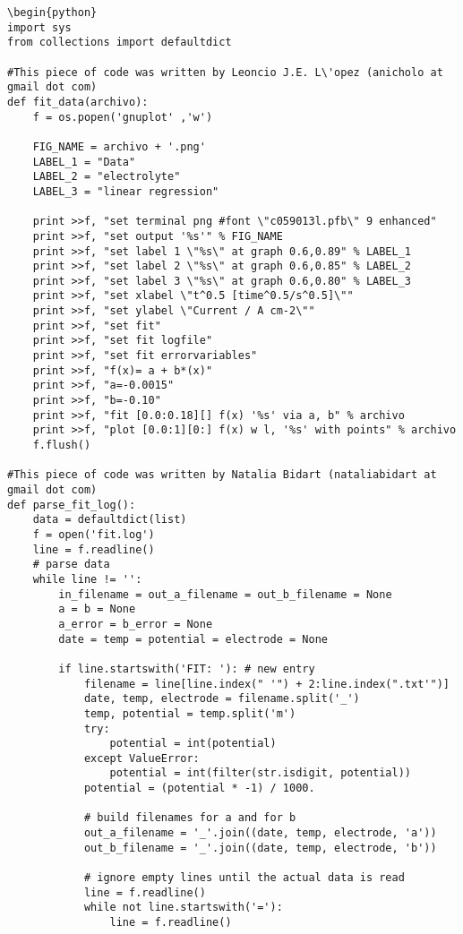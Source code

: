 \documentclass[a4paper]{article}
\begin{document}
\begin{verbatim}
\begin{python}
import sys
from collections import defaultdict

#This piece of code was written by Leoncio J.E. L\'opez (anicholo at gmail dot com) 
def fit_data(archivo):
    f = os.popen('gnuplot' ,'w')

    FIG_NAME = archivo + '.png'
    LABEL_1 = "Data"
    LABEL_2 = "electrolyte"
    LABEL_3 = "linear regression"

    print >>f, "set terminal png #font \"c059013l.pfb\" 9 enhanced"
    print >>f, "set output '%s'" % FIG_NAME
    print >>f, "set label 1 \"%s\" at graph 0.6,0.89" % LABEL_1
    print >>f, "set label 2 \"%s\" at graph 0.6,0.85" % LABEL_2
    print >>f, "set label 3 \"%s\" at graph 0.6,0.80" % LABEL_3
    print >>f, "set xlabel \"t^0.5 [time^0.5/s^0.5]\""
    print >>f, "set ylabel \"Current / A cm-2\""
    print >>f, "set fit"
    print >>f, "set fit logfile"
    print >>f, "set fit errorvariables"
    print >>f, "f(x)= a + b*(x)"
    print >>f, "a=-0.0015"
    print >>f, "b=-0.10"
    print >>f, "fit [0.0:0.18][] f(x) '%s' via a, b" % archivo
    print >>f, "plot [0.0:1][0:] f(x) w l, '%s' with points" % archivo
    f.flush()

#This piece of code was written by Natalia Bidart (nataliabidart at gmail dot com)
def parse_fit_log():
    data = defaultdict(list)
    f = open('fit.log')
    line = f.readline()
    # parse data
    while line != '':
        in_filename = out_a_filename = out_b_filename = None
        a = b = None
        a_error = b_error = None
        date = temp = potential = electrode = None

        if line.startswith('FIT: '): # new entry
            filename = line[line.index(" '") + 2:line.index(".txt'")]
            date, temp, electrode = filename.split('_')
            temp, potential = temp.split('m')
            try:
                potential = int(potential)
            except ValueError:
                potential = int(filter(str.isdigit, potential))
            potential = (potential * -1) / 1000.

            # build filenames for a and for b
            out_a_filename = '_'.join((date, temp, electrode, 'a'))
            out_b_filename = '_'.join((date, temp, electrode, 'b'))

            # ignore empty lines until the actual data is read
            line = f.readline()
            while not line.startswith('='):
                line = f.readline()


\end{verbatim}
\end{document}
